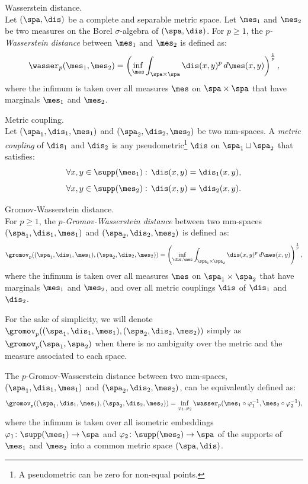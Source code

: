 \begin{definition}{Wasserstein distance.}\\
Let $(\spa,\dis)$ be a complete and separable metric space. Let $\mes_1$ and $\mes_2$ be two measures on the Borel $\sigma$-algebra of $(\spa,\dis)$. For $p \geq 1$, the {\it $p$-Wasserstein distance} between $\mes_1$ and $\mes_2$ is defined as:
$$\wasser_p(\mes_1,\mes_2)=\left(\inf_{\mes}\int_{\spa\times\spa} \dis(x,y)^p\,d\mes(x,y)\right)^{\frac{1}{p}},$$
where the infimum is taken over all measures $\mes$ on $\spa\times \spa$ that have marginals $\mes_1$ and $\mes_2$.
\end{definition}


\begin{definition}{Metric coupling.}\\
Let $(\spa_1,\dis_1,\mes_1)$ and $(\spa_2,\dis_2,\mes_2)$ be two mm-spaces.
A {\it metric coupling} of $\dis_1$ and $\dis_2$ is any pseudometric\footnote{A pseudometric can be zero for non-equal points.} $\dis$ on $\spa_1\sqcup \spa_2$ that satisfies:
$$\forall x,y\in \supp(\mes_1):\,\dis(x,y)=\dis_1(x,y),$$
$$\forall x,y\in \supp(\mes_2):\,\dis(x,y)=\dis_2(x,y).$$
\end{definition}

\begin{definition}{Gromov-Wasserstein distance.}\\
 For $p \geq 1$, the  {\it $p$-Gromov-Wasserstein distance} between two mm-spaces $(\spa_1,\dis_1,\mes_1)$ and $(\spa_2,\dis_2,\mes_2)$ is defined as:
$$\gromov_p((\spa_1,\dis_1,\mes_1),(\spa_2,\dis_2,\mes_2))=\left(\inf_{\dis,\mes}\int_{\spa_1\times \spa_2} \dis(x,y)^p\,d\mes(x,y)\right)^{\frac{1}{p}},$$
where the infimum is taken over all measures $\mes$ on $\spa_1\times \spa_2$ that have marginals $\mes_1$ and $\mes_2$, and over all metric couplings $\dis$ of $\dis_1$ and $\dis_2$.
\end{definition}

    For the sake of simplicity, we will denote $\gromov_p((\spa_1,\dis_1,\mes_1),(\spa_2,\dis_2,\mes_2))$ simply as $\gromov_p(\spa_1,\spa_2)$ when there is no ambiguity over the metric and the measure associated to each space.

\begin{proposition}\label{prop:gw_def}
The $p$-Gromov-Wasserstein distance between two mm-spaces, $(\spa_1,\dis_1,\mes_1)$ and $(\spa_2,\dis_2,\mes_2)$, can be equivalently defined as:
$$\gromov_p((\spa_1,\dis_1,\mes_1),(\spa_2,\dis_2,\mes_2))=\inf_{\varphi_1,\varphi_2}\wasser_p(\mes_1\circ\varphi_1^{-1},\mes_2\circ\varphi_2^{-1}),$$
where the infimum is taken over all isometric embeddings $\varphi_1\colon\supp(\mes_1)\rightarrow \spa$ and $\varphi_2\colon\supp(\mes_2)\rightarrow \spa$ of the supports of $\mes_1$ and $\mes_2$ into a common metric space $(\spa,\dis)$.
\end{proposition}

